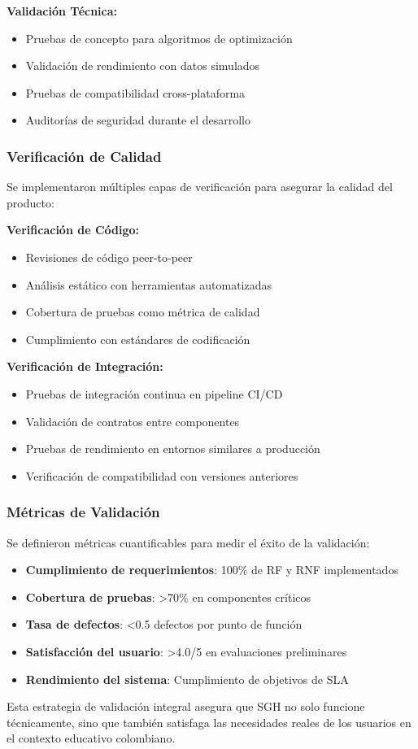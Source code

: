 \textbf{Validación Técnica:}
\begin{itemize}
\item Pruebas de concepto para algoritmos de optimización
\item Validación de rendimiento con datos simulados
\item Pruebas de compatibilidad cross-plataforma
\item Auditorías de seguridad durante el desarrollo
\end{itemize}

\subsubsection{Verificación de Calidad}

Se implementaron múltiples capas de verificación para asegurar la calidad del producto:

\textbf{Verificación de Código:}
\begin{itemize}
\item Revisiones de código peer-to-peer
\item Análisis estático con herramientas automatizadas
\item Cobertura de pruebas como métrica de calidad
\item Cumplimiento con estándares de codificación
\end{itemize}

\textbf{Verificación de Integración:}
\begin{itemize}
\item Pruebas de integración continua en pipeline CI/CD
\item Validación de contratos entre componentes
\item Pruebas de rendimiento en entornos similares a producción
\item Verificación de compatibilidad con versiones anteriores
\end{itemize}

\subsubsection{Métricas de Validación}

Se definieron métricas cuantificables para medir el éxito de la validación:

\begin{itemize}
\item \textbf{Cumplimiento de requerimientos}: 100\% de RF y RNF implementados
\item \textbf{Cobertura de pruebas}: >70\% en componentes críticos
\item \textbf{Tasa de defectos}: <0.5 defectos por punto de función
\item \textbf{Satisfacción del usuario}: >4.0/5 en evaluaciones preliminares
\item \textbf{Rendimiento del sistema}: Cumplimiento de objetivos de SLA
\end{itemize}

Esta estrategia de validación integral asegura que SGH no solo funcione técnicamente, sino que también satisfaga las necesidades reales de los usuarios en el contexto educativo colombiano.